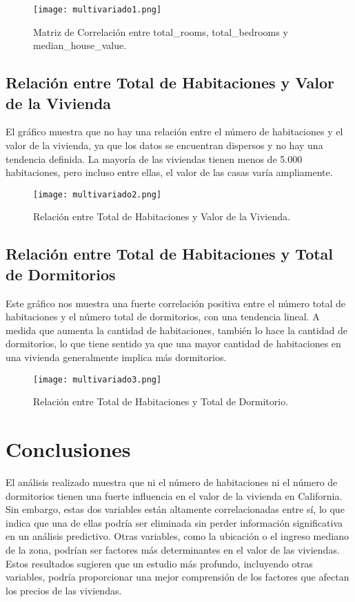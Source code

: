 \documentclass[a4paper, 10pt]{article}
\begin{document}
\begin{figure}[H]
    \centering
    \texttt{[image: multivariado1.png]} %
    \caption{Matriz de Correlación entre total\_rooms, total\_bedrooms y median\_house\_value.}
\end{figure}



\subsection{Relación entre Total de Habitaciones y Valor de la Vivienda}

El gráfico muestra que no hay una relación entre el número de habitaciones y el valor de la vivienda, ya que los datos se encuentran dispersos y no hay una tendencia definida. La mayoría de las viviendas tienen menos de 5.000 habitaciones, pero incluso entre ellas, el valor de las casas varía ampliamente. 

\begin{figure}[H]
    \centering
    \texttt{[image: multivariado2.png]} %
    \caption{Relación entre Total de Habitaciones y Valor de la Vivienda.}
\end{figure}

\subsection{Relación entre Total de Habitaciones y Total de Dormitorios}

Este gráfico nos muestra una fuerte correlación positiva entre el número total de habitaciones y el número total de dormitorios, con una tendencia lineal. A medida que aumenta la cantidad de habitaciones, también lo hace la cantidad de dormitorios, lo que tiene sentido ya que una mayor cantidad de habitaciones en una vivienda generalmente implica más dormitorios.  

\begin{figure}[H]
    \centering
    \texttt{[image: multivariado3.png]} %
    \caption{Relación entre Total de Habitaciones y Total de Dormitorio.}
\end{figure}


\section{Conclusiones}
El análisis realizado muestra que ni el número de habitaciones ni el número de dormitorios tienen una fuerte influencia en el valor de la vivienda en California. Sin embargo, estas dos variables están altamente correlacionadas entre sí, lo que indica que una de ellas podría ser eliminada sin perder información significativa en un análisis predictivo. Otras variables, como la ubicación o el ingreso mediano de la zona, podrían ser factores más determinantes en el valor de las viviendas. Estos resultados sugieren que un estudio más profundo, incluyendo otras variables, podría proporcionar una mejor comprensión de los factores que afectan los precios de las viviendas.
\end{document}
